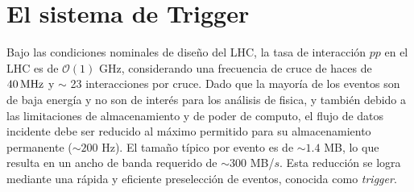 

\section{El sistema de Trigger}

Bajo las condiciones nominales de diseño del LHC, la tasa de interacción $pp$ en
el LHC es de $\mathcal{O}(1)$ GHz, considerando una frecuencia de cruce de haces
de $\unit[40]{MHz}$ y $\sim$ 23 interacciones por cruce. Dado que la mayoría de
los eventos son de baja energía y no son de interés para los análisis de fisica,
y también debido a las limitaciones de almacenamiento y de
poder de computo, el flujo de datos incidente debe ser reducido al máximo
permitido para su almacenamiento permanente ($\sim 200$ Hz). El tamaño típico
por evento es de $\sim 1.4$ MB, lo que resulta en un ancho de banda requerido de
$\sim 300$ MB/$s$. Esta reducción se logra mediante una rápida y eficiente
preselección de eventos, conocida como \emph{trigger}.

